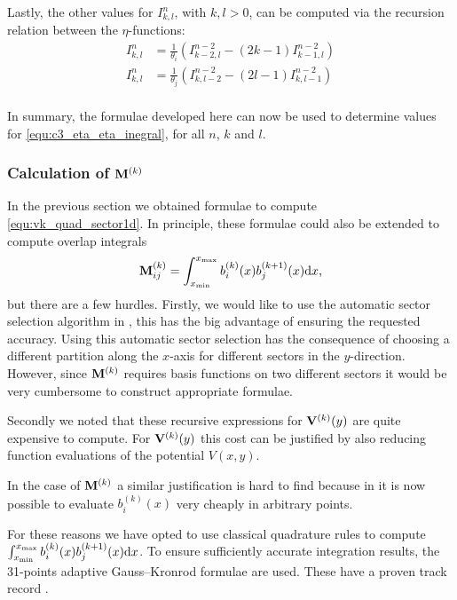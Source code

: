 Lastly, the other values for $I_{k,l}^n$, with $k, l > 0$, can be computed via the recursion relation between the $\eta$-functions:
\begin{align*}
  I_{k, l}^n & = \frac{1}{\theta_i} \left(I_{k-2,l}^{n-2} - (2k - 1) I_{k-1,l}^{n-2}\right) \\
  I_{k, l}^n & = \frac{1}{\theta_j} \left(I_{k,l-2}^{n-2} - (2l - 1) I_{k,l-1}^{n-2}\right) \\
\end{align*}

In summary, the formulae developed here can now be used to determine values for \eqref{equ:c3_eta_eta_inegral}, for all $n$, $k$ and $l$.

\subsubsection{Calculation of \texorpdfstring{$\vb{M}^{(k)}$}{M(k)}}

In the previous section we obtained formulae to compute \eqref{equ:vk_quad_sector1d}. In principle, these formulae could also be extended to compute overlap integrals
$$
  \vb{M}_{ij}^{(k)} = \int_{{x_{\text{min}}}}^{{x_{\text{max}}}}b_i^{(k)}(x)b_j^{(k+1)}(x)\dd x\text{,}
$$
but there are a few hurdles. Firstly, we would like to use the automatic sector selection algorithm in \matslise{}, this has the big advantage of ensuring the requested accuracy. Using this automatic sector selection has the consequence of choosing a different partition along the $x$-axis for different sectors in the $y$-direction. However, since $\vb{M}^{(k)}$ requires basis functions on two different sectors it would be very cumbersome to construct appropriate formulae.

Secondly we noted that these recursive expressions for $\vb{V}^{(k)}(y)$ are quite expensive to compute. For $\vb{V}^{(k)}(y)$ this cost can be justified by also reducing function evaluations of the potential $V(x, y)$.

In the case of $\vb{M}^{(k)}$ a similar justification is hard to find because in  it is now possible to evaluate $b^{(k)}_i(x)$ very cheaply in arbitrary points.

For these reasons we have opted to use classical quadrature rules to compute $\int_{{x_{\text{min}}}}^{{x_{\text{max}}}}b_i^{(k)}(x)b_j^{(k+1)}(x)\dd x$. To ensure sufficiently accurate integration results, the 31-points adaptive Gauss--Kronrod formulae are used. These have a proven track record \cite{piessens_quadpack_1983}.



